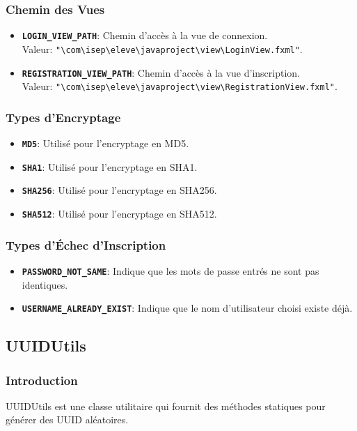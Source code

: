 \documentclass{article}
\begin{document}
\subsubsection{Chemin des Vues}
\begin{itemize}
  \item \textbf{\texttt{LOGIN\_VIEW\_PATH}}: Chemin d'accès à la vue de connexion.\\ Valeur:  \texttt{"\textbackslash com\textbackslash isep\textbackslash eleve\textbackslash javaproject\textbackslash view\textbackslash LoginView.fxml"}.
  \item \textbf{\texttt{REGISTRATION\_VIEW\_PATH}}: Chemin d'accès à la vue d'inscription. \\ Valeur:
  \texttt{"\textbackslash com\textbackslash isep\textbackslash eleve\textbackslash javaproject\textbackslash view\textbackslash RegistrationView.fxml"}.
\end{itemize}

\subsubsection{Types d'Encryptage}
\begin{itemize}
  \item \textbf{\texttt{MD5}}: Utilisé pour l'encryptage en MD5.
  \item \textbf{\texttt{SHA1}}: Utilisé pour l'encryptage en SHA1.
  \item \textbf{\texttt{SHA256}}: Utilisé pour l'encryptage en SHA256.
  \item \textbf{\texttt{SHA512}}: Utilisé pour l'encryptage en SHA512.
\end{itemize}

\subsubsection{Types d'Échec d'Inscription}
\begin{itemize}
  \item \textbf{\texttt{PASSWORD\_NOT\_SAME}}: Indique que les mots de passe entrés ne sont pas identiques.
  \item \textbf{\texttt{USERNAME\_ALREADY\_EXIST}}: Indique que le nom d'utilisateur choisi existe déjà.
\end{itemize}
\subsection{UUIDUtils}
\subsubsection{Introduction}
UUIDUtils est une classe utilitaire qui fournit des méthodes statiques pour générer des UUID aléatoires.
\end{document}
